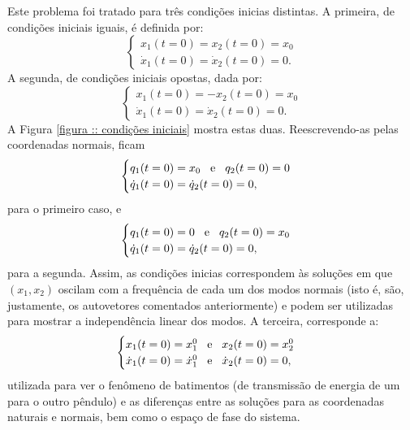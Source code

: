 \documentclass[a4paper, 11pt]{article}
\begin{document}
    Este problema foi tratado para três condições inicias distintas. A primeira, de condições iniciais iguais, é definida por:
    \begin{equation}
    \begin{cases}
        x_1(t=0)=x_2(t=0)=x_0\\
        \dot{x}_1(t=0)=\dot{x}_2(t=0)=0.
    \end{cases}
    \end{equation}
    A segunda, de condições iniciais opostas, dada por:
    \begin{equation}
    \begin{cases}
        x_1(t=0)=-x_2(t=0)=x_0\\
        \dot{x}_1(t=0)=\dot{x}_2(t=0)=0.
    \end{cases}
    \end{equation}
    A Figura \ref{figura :: condições iniciais} mostra estas duas. Reescrevendo-as pelas coordenadas normais, ficam
    \begin{equation}
    \begin{cases}
        q_1(t=0)=x_0 \hspace{0.3cm}\text{e}\hspace{0.3cm} q_2(t=0)=0\\
        \dot{q}_1(t=0)=\dot{q}_2(t=0)=0,
    \end{cases}
    \end{equation}
    para o primeiro caso, e
    \begin{equation}
    \begin{cases}
        q_1(t=0)=0 \hspace{0.3cm}\text{e}\hspace{0.3cm} q_2(t=0)=x_0\\
        \dot{q}_1(t=0)=\dot{q}_2(t=0)=0,
    \end{cases}
    \end{equation}
    para a segunda. Assim, as condições inicias correspondem às soluções em que $(x_1,x_2)$ oscilam com a frequência de cada um dos modos normais (isto é, são, justamente, os autovetores comentados anteriormente) e podem ser utilizadas para mostrar a independência linear dos modos. A terceira, corresponde a:
    \begin{equation}
    \begin{cases}
        x_1(t=0)=x_1^0 \hspace{0.3cm}\text{e}\hspace{0.3cm} x_2(t=0)=x_2^0\\
        \dot{x}_1(t=0)=\dot{x}_1^0 \hspace{0.3cm}\text{e}\hspace{0.3cm} \dot{x}_2(t=0)=0,
    \end{cases}
    \end{equation}
    utilizada para ver o fenômeno de batimentos (de transmissão de energia de um para o outro pêndulo) e as diferenças entre as soluções para as coordenadas naturais e normais, bem como o espaço de fase do sistema.
\end{document}
